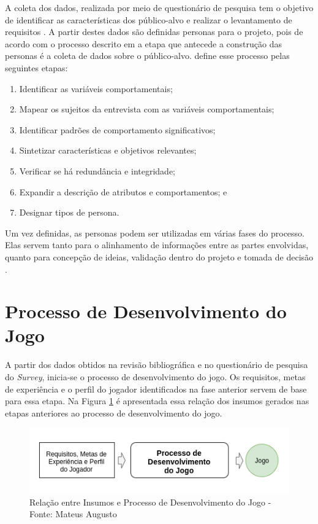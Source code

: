 A coleta dos dados, realizada por meio de questionário de pesquisa tem o objetivo de identificar as características dos público-alvo e realizar o levantamento de requisitos \cite[p. 128]{Pressman_2000}. A partir destes dados são definidas personas para o projeto, pois de acordo com o processo descrito em \citeauthor{usability2020} a etapa que antecede a construção das personas é a coleta de dados sobre o público-alvo.  define esse processo pelas seguintes etapas:

\begin{enumerate}
    \item Identificar as variáveis comportamentais;
    \item Mapear os sujeitos da entrevista com as variáveis comportamentais;
    \item Identificar padrões de comportamento significativos;
    \item Sintetizar características e objetivos relevantes;
    \item Verificar se há redundância e integridade;
    \item Expandir a descrição de atributos e comportamentos; e
    \item Designar tipos de persona.
\end{enumerate}

Um vez definidas, as personas podem ser utilizadas em várias fases do processo. Elas servem tanto para o alinhamento de informações entre as partes envolvidas, quanto para concepção de ideias, validação dentro do projeto e tomada de decisão \cite[p. 80]{Vianna_2014}. %

\section{Processo de Desenvolvimento do Jogo}
\label{sec:pdj}
A partir dos dados obtidos na revisão bibliográfica e no questionário de pesquisa do \textit{Survey}, inicia-se o processo de desenvolvimento do jogo. Os requisitos, metas de experiência e o perfil do jogador identificados na fase anterior servem de base para essa etapa. Na Figura \ref{Fig:overview-process.png} é apresentada essa relação dos insumos gerados nas etapas anteriores ao processo de desenvolvimento do jogo.

\begin{figure}[htbp]
	\centering
		\includegraphics[keepaspectratio=true,scale=0.65]{figuras/overview-process.png}
	\caption{\textcolor{textmodified}{Relação entre Insumos e Processo de Desenvolvimento do Jogo - Fonte: Mateus Augusto}}
	\label{Fig:overview-process.png}
\end{figure}

